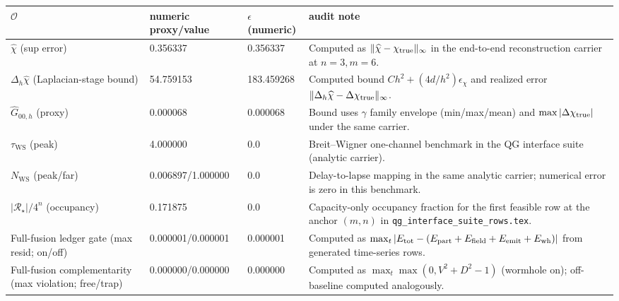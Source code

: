 \begin{center}
\scriptsize
\setlength{\tabcolsep}{6pt}
\renewcommand{\arraystretch}{1.15}
\begin{tabular}{p{} p{} p{} p{}}
\toprule
$\mathcal{O}$ & numeric proxy/value & $\epsilon$ (numeric) & audit note \\
\midrule
$\widehat\chi$ (sup error) & 0.356337 & 0.356337 & Computed as $\|\widehat\chi-\chi_{\rm true}\|_\infty$ in the end-to-end reconstruction carrier at $n=3,m=6$. \\
$\Delta_h\widehat\chi$ (Laplacian-stage bound) & 54.759153 & 183.459268 & Computed bound $C h^2+(4d/h^2)\epsilon_\chi$ and realized error $\|\Delta_h\widehat\chi-\Delta\chi_{\rm true}\|_\infty$. \\
$\widehat G_{00,h}$ (proxy) & 0.000068 & 0.000068 & Bound uses $\gamma$ family envelope (min/max/mean) and $\max|\Delta\chi_{\rm true}|$ under the same carrier. \\
$\tau_{\mathrm{WS}}$ (peak) & 4.000000 & 0.0 & Breit--Wigner one-channel benchmark in the QG interface suite (analytic carrier). \\
$N_{\mathrm{WS}}$ (peak/far) & 0.006897/1.000000 & 0.0 & Delay-to-lapse mapping in the same analytic carrier; numerical error is zero in this benchmark. \\
$|\mathcal{R}_\star|/4^n$ (occupancy) & 0.171875 & 0.0 & Capacity-only occupancy fraction for the first feasible row at the anchor $(m,n)$ in \texttt{qg\_interface\_suite\_rows.tex}. \\
Full-fusion ledger gate (max resid; on/off) & 0.000001/0.000001 & 0.000001 & Computed as $\max_t |E_{\rm tot}-(E_{\rm part}+E_{\rm field}+E_{\rm emit}+E_{\rm wh})|$ from generated time-series rows. \\
Full-fusion complementarity (max violation; free/trap) & 0.000000/0.000000 & 0.000000 & Computed as $\max_t \max(0,V^2+D^2-1)$ (wormhole on); off-baseline computed analogously. \\
\bottomrule
\end{tabular}
\end{center}